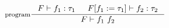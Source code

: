 \documentclass{article}
\begin{document}
\[
  \inference[program]{
    F \vdash f_1 : \tau_1 & F[f_1 := \tau_1] \vdash f_2 : \tau_2 \\
  }{
    F \vdash f_1 \ f_2
  }
\]
\end{document}
